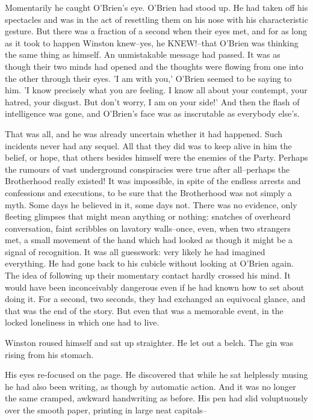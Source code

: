 \documentclass{article}
\begin{document}
Momentarily he caught O'Brien's eye. O'Brien had stood up. He had taken
off his spectacles and was in the act of resettling them on his nose with
his characteristic gesture. But there was a fraction of a second when
their eyes met, and for as long as it took to happen Winston knew--yes, he
KNEW!--that O'Brien was thinking the same thing as himself. An unmistakable
message had passed. It was as though their two minds had opened and the
thoughts were flowing from one into the other through their eyes. 'I am
with you,' O'Brien seemed to be saying to him. 'I know precisely what you
are feeling. I know all about your contempt, your hatred, your disgust.
But don't worry, I am on your side!' And then the flash of intelligence
was gone, and O'Brien's face was as inscrutable as everybody else's.

That was all, and he was already uncertain whether it had happened. Such
incidents never had any sequel. All that they did was to keep alive in him
the belief, or hope, that others besides himself were the enemies of the
Party. Perhaps the rumours of vast underground conspiracies were true after
all--perhaps the Brotherhood really existed! It was impossible, in spite
of the endless arrests and confessions and executions, to be sure that the
Brotherhood was not simply a myth. Some days he believed in it, some days
not. There was no evidence, only fleeting glimpses that might mean anything
or nothing: snatches of overheard conversation, faint scribbles on lavatory
walls--once, even, when two strangers met, a small movement of the hand
which had looked as though it might be a signal of recognition. It was all
guesswork: very likely he had imagined everything. He had gone back to his
cubicle without looking at O'Brien again. The idea of following up their
momentary contact hardly crossed his mind. It would have been inconceivably
dangerous even if he had known how to set about doing it. For a second, two
seconds, they had exchanged an equivocal glance, and that was the end of
the story. But even that was a memorable event, in the locked loneliness in
which one had to live.

Winston roused himself and sat up straighter. He let out a belch. The gin
was rising from his stomach.

His eyes re-focused on the page. He discovered that while he sat helplessly
musing he had also been writing, as though by automatic action. And it was
no longer the same cramped, awkward handwriting as before. His pen had slid
voluptuously over the smooth paper, printing in large neat capitals--
\end{document}
